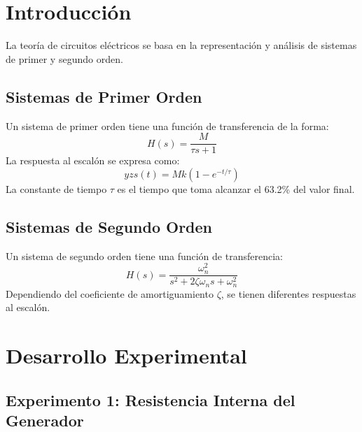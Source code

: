 \documentclass[10pt,openany]{book}
\begin{document}


\tableofcontents

\newpage

\section*{Introducción}
La teoría de circuitos eléctricos se basa en la representación y análisis de sistemas de primer y segundo orden. 

\subsection*{Sistemas de Primer Orden}
Un sistema de primer orden tiene una función de transferencia de la forma:
\begin{equation}
    H(s) = \frac{M}{\tau s + 1}
\end{equation}
La respuesta al escalón se expresa como:
\begin{equation}
    yzs(t) = M k \left(1 - e^{-t/\tau} \right)
\end{equation}
La constante de tiempo $\tau$ es el tiempo que toma alcanzar el 63.2\% del valor final.

\subsection*{Sistemas de Segundo Orden}
Un sistema de segundo orden tiene una función de transferencia:
\begin{equation}
    H(s) = \frac{\omega_n^2}{s^2 + 2\zeta \omega_n s + \omega_n^2}
\end{equation}
Dependiendo del coeficiente de amortiguamiento $\zeta$, se tienen diferentes respuestas al escalón.

\section*{Desarrollo Experimental}

\subsection*{Experimento 1: Resistencia Interna del Generador}
\end{document}
